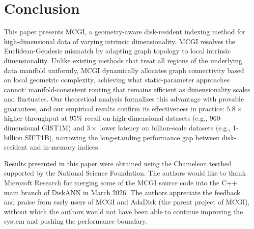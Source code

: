 \documentclass{article}
\theoremstyle{plain}
\theoremstyle{definition}
\theoremstyle{remark}
\newcommand{\ours}{MCGI\xspace}
\begin{document}



\section{Conclusion}

This paper presents MCGI, a geometry-aware disk-resident indexing method for high-dimensional data of varying intrinsic dimensionality.
MCGI resolves the Euclidean-Geodesic mismatch by adapting graph topology to local intrinsic dimensionality. Unlike existing methods that treat all regions of the underlying data manifold uniformly, MCGI dynamically allocates graph connectivity based on local geometric complexity, achieving what static-parameter approaches cannot: manifold-consistent routing that remains efficient as dimensionality scales and fluctuates. Our theoretical analysis formalizes this advantage with provable guarantees, and our empirical results confirm its effectiveness in practice: $5.8\times$ higher throughput at 95\% recall on high-dimensional datasets (e.g., 960-dimensional GIST1M) and $3\times$ lower latency on billion-scale datasets (e.g., 1-billion SIFT1B), narrowing the long-standing performance gap between disk-resident and in-memory indices. 


\begin{ack}
Results presented in this paper were obtained using the Chameleon testbed supported by the National Science Foundation.
The authors would like to thank Microsoft Research for merging some of the MCGI source code into the C++ main branch of DiskANN in March 2026.
The authors appreciate the feedback and praise from early users of MCGI and AdaDisk (the parent project of MCGI), without which the authors would not have been able to continue improving the system and pushing the performance boundary.
\end{ack}
\end{document}
